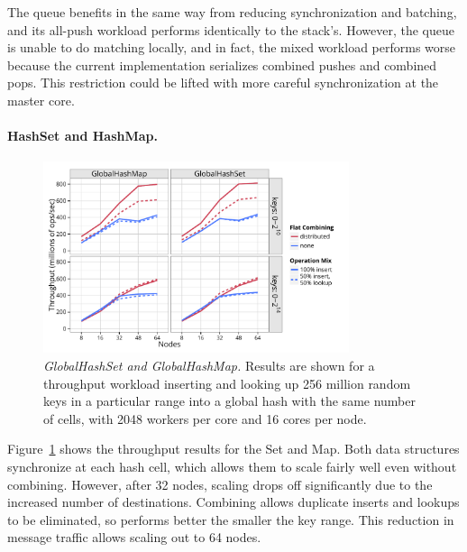 The queue benefits in the same way from reducing synchronization and batching, and its all-push workload performs identically to the stack's.
However, the queue is unable to do matching locally, and in fact, the mixed workload performs worse because the current implementation serializes combined pushes and combined pops. This restriction could be lifted with more careful synchronization at the master core.

\paragraph{HashSet and HashMap.}
\begin{figure}[t]
  \centering
  \includegraphics[width=0.8\textwidth]{data/plots/hash_perf.pdf}
  \caption{\emph{GlobalHashSet and GlobalHashMap.}
    Results are shown for a throughput workload inserting and looking up 256 million random keys in a particular range into a global hash with the same number of cells, with 2048 workers per core and 16 cores per node.
  }
  \label{fig:hash_perf}
\end{figure}

Figure~\ref{fig:hash_perf} shows the throughput results for the Set and Map.
Both data structures synchronize at each hash cell, which allows them to scale fairly well even without combining. However, after 32 nodes, scaling drops off significantly due to the increased number of destinations.
Combining allows duplicate inserts and lookups to be eliminated, so performs better the smaller the key range. This reduction in message traffic allows scaling out to 64 nodes.

